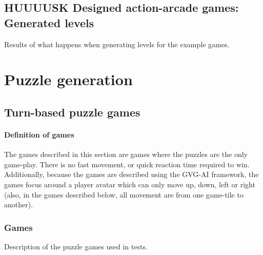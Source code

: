 \documentclass[a4paper,titlepage,final]{report}
\begin{document}


\section{HUUUUSK Designed action-arcade games: Generated levels}
Results of what happens when generating levels for the example games.


\chapter{Puzzle generation}
\label{ch_puzzles}

\section{Turn-based puzzle games}

\subsubsection*{Definition of games}
The games described in this section are games where the puzzles are the only game-play. There is no fast movement, or quick reaction time required to win. Additionally, because the games are described using the GVG-AI framework, the games focus around a player avatar which can only move up, down, left or right (also, in the games described below, all movement are from one game-tile to another).

\subsection{Games} 
Description of the puzzle games used in tests. 
\end{document}
